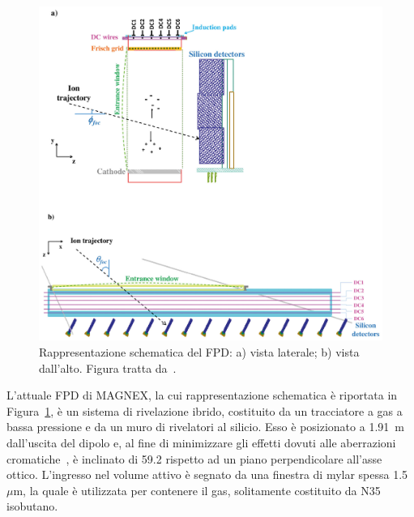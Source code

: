 \begin{figure} [!p]
	\centering
	\includegraphics[width=\textwidth, keepaspectratio]{Grafici/fpd.png}
	\caption{Rappresentazione schematica del FPD: a) vista laterale; b) vista dall'alto. Figura tratta da~\cite{cappuzzello:epja18}.} \label{fig:fpd}
\end{figure}


L'attuale FPD di MAGNEX, la cui rappresentazione schematica è riportata in Figura~\ref{fig:fpd}, è un sistema di rivelazione ibrido, costituito da un tracciatore a gas a bassa pressione e da un muro di rivelatori al silicio.
Esso è posizionato a 1.91~m dall'uscita del dipolo e, al fine di minimizzare gli effetti dovuti alle aberrazioni cromatiche~\cite{cunsolo:nima01}, è inclinato di 59.2\textdegree{} rispetto ad un piano perpendicolare all'asse ottico.
L'ingresso nel volume attivo è segnato da una finestra di mylar spessa 1.5~$\mu$m, la quale è utilizzata per contenere il gas, solitamente costituito da N35 isobutano.



